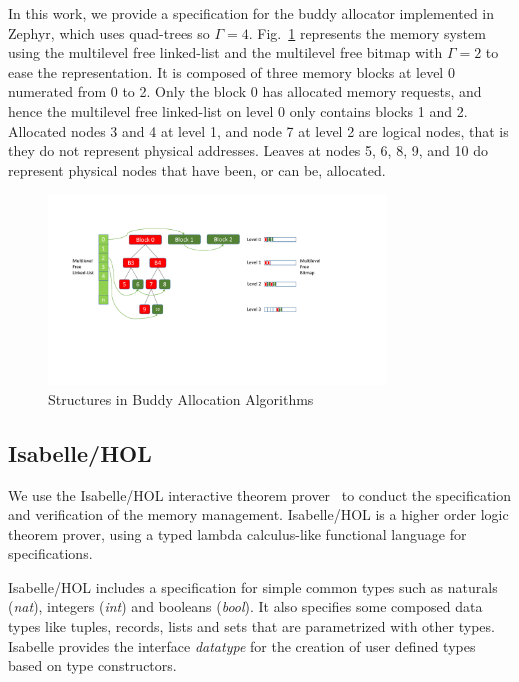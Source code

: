 In this work, we provide a specification for the buddy allocator implemented in Zephyr, which uses quad-trees so $\Gamma = 4$. Fig.~\ref{fig3} represents the memory system using the multilevel free linked-list and the multilevel free bitmap with $\Gamma = 2$ to ease the representation. It is composed of three memory blocks at level 0 numerated from 0 to 2. Only the block 0 has allocated memory requests, and hence the multilevel free linked-list on level 0 only contains blocks 1 and 2. Allocated nodes 3 and 4 at level 1, and node 7 at level 2 are logical nodes, that is they do not represent physical addresses. Leaves at nodes 5, 6, 8, 9, and 10 do represent physical nodes that have been, or can be, allocated.

\begin{figure}[htbp]
	\centering
	\includegraphics[width=0.8\textwidth]{fig3.pdf}
	\caption{Structures in Buddy Allocation Algorithms}
	\label{fig3}
\end{figure}

\subsection{Isabelle/HOL}
We use the Isabelle/HOL interactive theorem prover~\cite{reg_Isabelle/HOL} to conduct the specification and verification of the memory management. Isabelle/HOL is a higher order logic theorem prover, using a typed lambda calculus-like functional language for specifications.

Isabelle/HOL includes a specification for simple common types such as naturals (\emph{nat}), integers (\emph{int}) and booleans (\emph{bool}). It also specifies some composed data types like tuples, records, lists and sets that are parametrized with other types. Isabelle provides the interface \emph{datatype} for the creation of user defined types based on type constructors.

